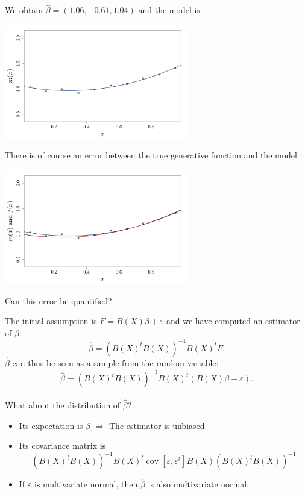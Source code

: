 \documentclass{beamer}
\DeclareMathOperator*{\Cov}{cov}
\begin{document}
\begin{frame}{}
\begin{example}
We obtain $\hat{\beta} = (1.06,-0.61,1.04)$ and the model is:
\begin{center}
  \includegraphics[height=5cm]{figures/R/linreg_2}
\end{center}
\end{example}
\end{frame}

\begin{frame}{}
\begin{example}
There is of course an error between the true generative function and the model
\begin{center}
  \includegraphics[height=5cm]{figures/R/linreg_3}
\end{center}
Can this error be quantified?
\end{example}
\end{frame}

\begin{frame}{}
The initial assumption is $ F = B(X) \beta  + \varepsilon$ and we have computed an estimator of $\beta$:
$$\hat{\beta} = (B(X)^t B(X))^{-1} B(X)^t F.$$
$\hat{\beta}$ can thus be seen as a sample from the random variable:
$$\hat{\beta} = (B(X)^t B(X))^{-1} B(X)^t (B(X) \beta  + \varepsilon).$$ \\
\vspace{5mm}
What about the distribution of $\hat{\beta}$? \pause
\begin{itemize}
	\item Its expectation is $\beta$ \alert{$\Rightarrow$} The estimator is unbiased
	\item Its covariance matrix is $$(B(X)^t B(X))^{-1} B(X)^t \Cov[\varepsilon,\varepsilon^t] B(X) (B(X)^t B(X))^{-1}$$
	\item If $\varepsilon$ is multivariate normal, then $\hat{\beta}$ is also multivariate normal.
\end{itemize}
\end{frame}
\end{document}
